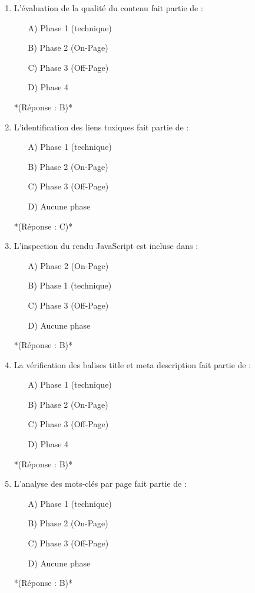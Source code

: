 \documentclass[12pt,a4paper,twoside]{report}
\begin{document}
\begin{enumerate}
    \item L'évaluation de la qualité du contenu fait partie de :
    \begin{itemize}
        \item[A)] Phase 1 (technique)
        \item[B)] Phase 2 (On-Page)
        \item[C)] Phase 3 (Off-Page)
        \item[D)] Phase 4
    \end{itemize}
    *(Réponse : B)*

    \item L'identification des liens toxiques fait partie de :
    \begin{itemize}
        \item[A)] Phase 1 (technique)
        \item[B)] Phase 2 (On-Page)
        \item[C)] Phase 3 (Off-Page)
        \item[D)] Aucune phase
    \end{itemize}
    *(Réponse : C)*

    \item L'inspection du rendu JavaScript est incluse dans :
    \begin{itemize}
        \item[A)] Phase 2 (On-Page)
        \item[B)] Phase 1 (technique)
        \item[C)] Phase 3 (Off-Page)
        \item[D)] Aucune phase
    \end{itemize}
    *(Réponse : B)*

    \item La vérification des balises title et meta description fait partie de :
    \begin{itemize}
        \item[A)] Phase 1 (technique)
        \item[B)] Phase 2 (On-Page)
        \item[C)] Phase 3 (Off-Page)
        \item[D)] Phase 4
    \end{itemize}
    *(Réponse : B)*

    \item L'analyse des mots-clés par page fait partie de :
    \begin{itemize}
        \item[A)] Phase 1 (technique)
        \item[B)] Phase 2 (On-Page)
        \item[C)] Phase 3 (Off-Page)
        \item[D)] Aucune phase
    \end{itemize}
    *(Réponse : B)*


\end{enumerate}
\end{document}
